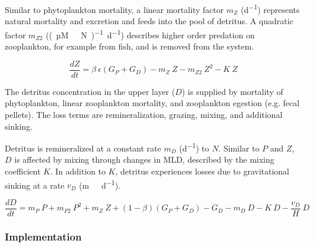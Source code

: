 \documentclass[journal abbreviation, manuscript]{copernicus}
\begin{document}
Similar to phytoplankton mortality, a linear mortality factor $m_Z$ (\unit{d^{-1}}) represents natural mortality and excretion and feeds into the pool of detritus. A quadratic factor $m_{Z2}$ (\unit{(µM \ N)^{-1} d^{−1}}) describes higher order predation on zooplankton, for example from fish, and is removed from the system. 

\begin{equation}
    \frac{d Z}{d t} =
    \beta \ \epsilon(G_P + G_D) %
    - m_Z \ Z %
    - m_{Z2} \ Z^2 %
    - K \ Z %
\end{equation}


The detritus concentration in the upper layer ($D$) is supplied by mortality of phytoplankton, linear zooplankton mortality, and zooplankton egestion (e.g. fecal pellets). The loss terms are remineralization, grazing, mixing, and additional sinking. 

Detritus is remineralized at a constant rate $m_D$ (\unit{d^{−1}}) to $N$. Similar to $P$ and $Z$, $D$ is affected by mixing through changes in MLD, described by the mixing coefficient $K$. In addition to $K$, detritus experiences losses due to gravitational sinking at a rate $v_D$ (\unit{m \ d^{−1}}). 

\begin{equation}
    \frac{d D}{d t} = 
    m_P \ P %
    + m_{P2} \ P^2 %
    + m_Z \ Z %
    + (1 - \beta)(G_P + G_D) %
    - G_D %
    - m_D \ D %
    - K \ D %
    - \frac{v_D}{H} \ D %
\end{equation}






\subsubsection{Implementation}
\label{Section:EMPOWERImplementation}
\end{document}
